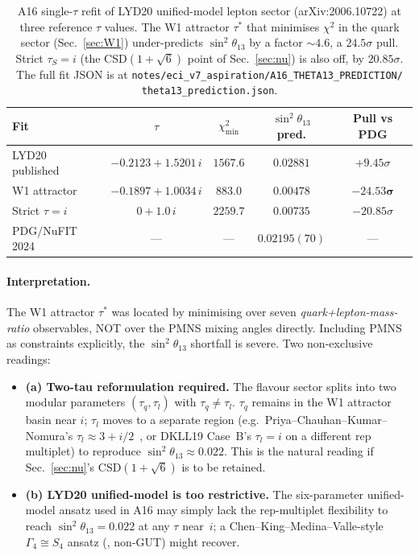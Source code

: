 \documentclass[a4paper,11pt]{article}
\theoremstyle{definition}
\theoremstyle{remark}
\begin{document}
\begin{table}[ht]
\centering
\begin{tabular}{lcccc}
\toprule
Fit & $\tau$ & $\chi^2_{\min}$ & $\sin^2\theta_{13}$ pred. & Pull vs PDG\\
\midrule
LYD20 published~\cite{LYD20} & $-0.2123+1.5201\,i$ & $1567.6$ & $0.02881$ & $+9.45\sigma$ \\
W1 attractor & $-0.1897+1.0034\,i$ & $\bm{883.0}$ & $\bm{0.00478}$ & $\bm{-24.53\sigma}$ \\
Strict $\tau=i$ & $0+1.0\,i$ & $2259.7$ & $0.00735$ & $-20.85\sigma$ \\
\midrule
PDG/NuFIT 2024 & --- & --- & $0.02195(70)$ & --- \\
\bottomrule
\end{tabular}
\caption{A16 single-$\tau$ refit of LYD20 unified-model lepton sector
(arXiv:2006.10722) at three reference $\tau$ values.  The W1 attractor
$\tau^{*}$ that minimises $\chi^2$ in the quark sector
(Sec.~\ref{sec:W1}) under-predicts $\sin^2\theta_{13}$ by a factor
$\sim 4.6$, a $24.5\sigma$ pull.  Strict $\tau_S=i$ (the
CSD$(1+\sqrt 6)$ point of Sec.~\ref{sec:nu}) is also off, by
$20.85\sigma$.  The full fit JSON is at
\texttt{notes/eci\_v7\_aspiration/A16\_THETA13\_PREDICTION/}
\texttt{theta13\_prediction.json}.}
\label{tab:A16}
\end{table}

\paragraph{Interpretation.}
The W1 attractor $\tau^{*}$ was located by minimising over seven
\emph{quark+lepton-mass-ratio} observables, NOT over the PMNS
mixing angles directly.  Including PMNS as constraints
explicitly, the $\sin^2\theta_{13}$ shortfall is severe.  Two
non-exclusive readings:
\begin{itemize}
  \item \textbf{(a) Two-tau reformulation required.} The flavour
    sector splits into two modular parameters
    $(\tau_q,\tau_l)$ with $\tau_q\ne\tau_l$.  $\tau_q$ remains in
    the W1 attractor basin near $i$; $\tau_l$ moves to a separate
    region (e.g.\ Priya--Chauhan--Kumar--Nomura's
    $\tau_l\approx 3+i/2$~\cite{Priya26}, or DKLL19 Case~B's
    $\tau_l = i$ on a different rep multiplet) to reproduce
    $\sin^2\theta_{13}\approx 0.022$.  This is the natural reading
    if Sec.~\ref{sec:nu}'s CSD$(1+\sqrt 6)$ is to be retained.
  \item \textbf{(b) LYD20 unified-model is too restrictive.} The
    six-parameter unified-model ansatz used in A16 may simply lack
    the rep-multiplet flexibility to reach
    $\sin^2\theta_{13}=0.022$ at any $\tau$ near~$i$;
    a Chen--King--Medina--Valle-style $\Gamma_4\cong S_4$ ansatz
    (\cite{ChenKMV23}, non-GUT) might recover.
\end{itemize}
\end{document}
